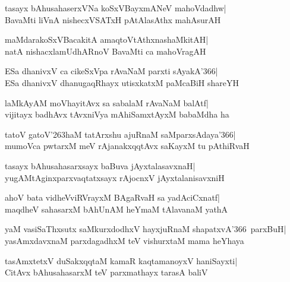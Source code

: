 \documentclass[twoside,12pt,openright]{book}
\def\S{\char'263}
\newcounter{shloka}[chapter]
\begin{document}
\begin{shloka}%
tasayx bAhusahaserxVNa koSxVBayxmANeV mahoVdadhw|\\
BavaMti liVnA nishecxVSATxH pAtAlasAthx mahAsurAH
\end{shloka}

\begin{shloka}%
maMdarakoSxVBacakitA amaqtoVtAthxnashaMkitAH|\\
natA nishacxlamUdhARnoV BavaMti ca mahoVragAH
\end{shloka}

\begin{shloka}%
ESa dhanivxV ca cikeSxVpa rAvaNaM parxti sAyakA\char'366|\\
ESa dhanivxV dhanugaqRhayx utisxkatxM paMcaBiH shareYH
\end{shloka}

\begin{shloka}%
laMkAyAM moVhayitAvx sa sabalaM rAvaNaM balAtf|\\
vijitayx badhAvx tAvxniVya mAhiSamxtAyxM babaMdha ha
\end{shloka}

\begin{shloka}%
tatoV gatoV\S haM tatArxshu ajuRnaM saMparxsAdaya\char'366|\\
mumoVca pwtarxM meV rAjanakxqqtAvx saKayxM tu pAthiRvaH
\end{shloka}

\begin{shloka}%
tasayx bAhusahasarxsayx baBuva jAyxtalasavxnaH|\\
yugAMtAginxparxvaqtatxsayx rAjocnxV jAyxtalanisavxniH
\end{shloka}

\begin{shloka}%
ahoV bata vidheVviRVrayxM BAgaRvaH sa yadAciCxnatf|\\
maqdheV sahasarxM bAhUnAM heYmaM tAlavanaM yathA
\end{shloka}

\begin{shloka}%
yaM vasiSaThxsutx saMkurxdodhxV hayxjuRnaM
shapatxvA\char'366\ parxBuH|\\
yasAmxdavxnaM parxdagadhxM teV vishurxtaM mama heYhaya
\end{shloka}

\begin{shloka}%
tasAmxtetxV duSakxqqtaM kamaR kaqtamanoyxV haniSayxti|\\
CitAvx bAhusahasarxM teV parxmathayx tarasA baliV
\end{shloka}
\end{document}
